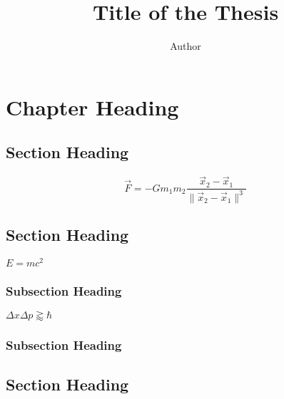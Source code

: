 \documentclass[dissertation,math,vertlayout]{aaltoseries}
\author{Author}
\title{Title of the Thesis}
\begin{document}

\draftabstract[finnish]{\lipsum[4-6]}
\draftabstract[swedish]{\lipsum[7-9]}

\begin{preface}
\lipsum[1-4]
\end{preface}

\clearpage
\tableofcontents

\listofpublications



\chapter{Chapter Heading}
\section{Section Heading}
\[
\vec{F}=-G m_1 m_2 \frac{\vec{x}_2-\vec{x}_1}{\lVert{\vec{x}_2-\vec{x}_1}\rVert^3}
\]
\lipsum[1-4]
\cite{Knuth1984:The-TeXbook}
\section{Section Heading}
$E=mc^2$
\lipsum[5-6]

\cite{WikiBooks2008:LaTeX}
\subsection{Subsection Heading}
$\Delta x\Delta p \gtrapprox \hbar$
\lipsum[7-8]
\subsection{Subsection Heading}
\lipsum[9-10]
\section{Section Heading}
\lipsum[11-12]

\end{document}
